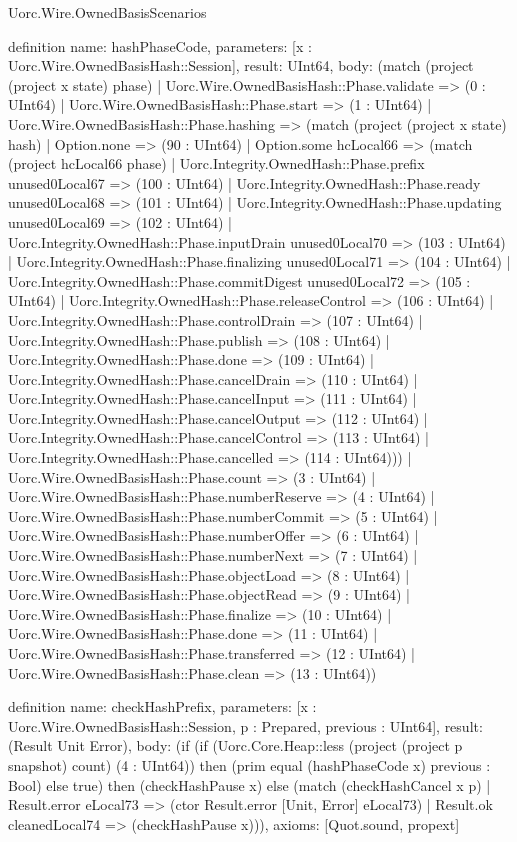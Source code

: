 \begin{lexlean}{Uorc.Wire.OwnedBasisScenarios}
\begin{semanticmodule}
definition{
  name: hashPhaseCode,
  parameters: [x : Uorc.Wire.OwnedBasisHash::Session],
  result: UInt64,
  body: (match (project (project x state) phase)
    | Uorc.Wire.OwnedBasisHash::Phase.validate => (0 : UInt64)
    | Uorc.Wire.OwnedBasisHash::Phase.start => (1 : UInt64)
    | Uorc.Wire.OwnedBasisHash::Phase.hashing => (match (project (project x state) hash)
      | Option.none => (90 : UInt64)
      | Option.some hcLocal66 => (match (project hcLocal66 phase)
        | Uorc.Integrity.OwnedHash::Phase.prefix unused0Local67 => (100 : UInt64)
        | Uorc.Integrity.OwnedHash::Phase.ready unused0Local68 => (101 : UInt64)
        | Uorc.Integrity.OwnedHash::Phase.updating unused0Local69 => (102 : UInt64)
        | Uorc.Integrity.OwnedHash::Phase.inputDrain unused0Local70 => (103 : UInt64)
        | Uorc.Integrity.OwnedHash::Phase.finalizing unused0Local71 => (104 : UInt64)
        | Uorc.Integrity.OwnedHash::Phase.commitDigest unused0Local72 => (105 : UInt64)
        | Uorc.Integrity.OwnedHash::Phase.releaseControl => (106 : UInt64)
        | Uorc.Integrity.OwnedHash::Phase.controlDrain => (107 : UInt64)
        | Uorc.Integrity.OwnedHash::Phase.publish => (108 : UInt64)
        | Uorc.Integrity.OwnedHash::Phase.done => (109 : UInt64)
        | Uorc.Integrity.OwnedHash::Phase.cancelDrain => (110 : UInt64)
        | Uorc.Integrity.OwnedHash::Phase.cancelInput => (111 : UInt64)
        | Uorc.Integrity.OwnedHash::Phase.cancelOutput => (112 : UInt64)
        | Uorc.Integrity.OwnedHash::Phase.cancelControl => (113 : UInt64)
        | Uorc.Integrity.OwnedHash::Phase.cancelled => (114 : UInt64)))
    | Uorc.Wire.OwnedBasisHash::Phase.count => (3 : UInt64)
    | Uorc.Wire.OwnedBasisHash::Phase.numberReserve => (4 : UInt64)
    | Uorc.Wire.OwnedBasisHash::Phase.numberCommit => (5 : UInt64)
    | Uorc.Wire.OwnedBasisHash::Phase.numberOffer => (6 : UInt64)
    | Uorc.Wire.OwnedBasisHash::Phase.numberNext => (7 : UInt64)
    | Uorc.Wire.OwnedBasisHash::Phase.objectLoad => (8 : UInt64)
    | Uorc.Wire.OwnedBasisHash::Phase.objectRead => (9 : UInt64)
    | Uorc.Wire.OwnedBasisHash::Phase.finalize => (10 : UInt64)
    | Uorc.Wire.OwnedBasisHash::Phase.done => (11 : UInt64)
    | Uorc.Wire.OwnedBasisHash::Phase.transferred => (12 : UInt64)
    | Uorc.Wire.OwnedBasisHash::Phase.clean => (13 : UInt64))
}

definition{
  name: checkHashPrefix,
  parameters: [x : Uorc.Wire.OwnedBasisHash::Session, p : Prepared, previous : UInt64],
  result: (Result Unit Error),
  body: (if (if (Uorc.Core.Heap::less (project (project p snapshot) count) (4 : UInt64)) then (prim equal (hashPhaseCode x) previous : Bool) else true) then (checkHashPause x) else (match (checkHashCancel x p)
    | Result.error eLocal73 => (ctor Result.error [Unit, Error] eLocal73)
    | Result.ok cleanedLocal74 => (checkHashPause x))),
  axioms: [Quot.sound, propext]
}


\end{semanticmodule}
\end{lexlean}
